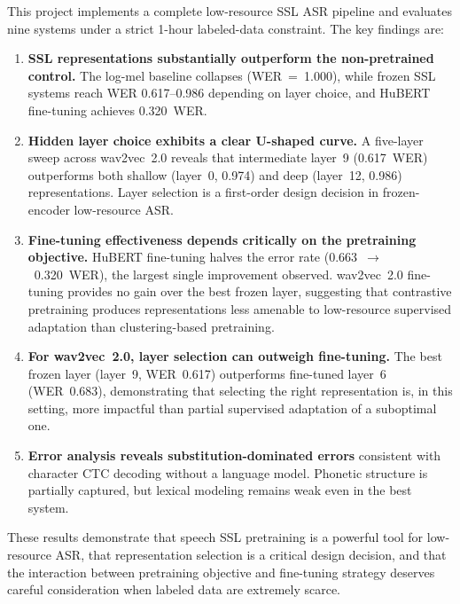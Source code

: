 \documentclass{article}
\begin{document}
This project implements a complete low-resource SSL ASR pipeline and evaluates
nine systems under a strict 1-hour labeled-data constraint. The key findings are:

\begin{enumerate}
\item \textbf{SSL representations substantially outperform the non-pretrained
  control.} The log-mel baseline collapses (WER~=~1.000), while frozen SSL
  systems reach WER 0.617--0.986 depending on layer choice, and HuBERT
  fine-tuning achieves 0.320~WER.
\item \textbf{Hidden layer choice exhibits a clear U-shaped curve.} A five-layer
  sweep across wav2vec~2.0 reveals that intermediate layer~9 (0.617~WER)
  outperforms both shallow (layer~0, 0.974) and deep (layer~12, 0.986)
  representations. Layer selection is a first-order design decision in
  frozen-encoder low-resource ASR.
\item \textbf{Fine-tuning effectiveness depends critically on the pretraining
  objective.} HuBERT fine-tuning halves the error rate (0.663~$\to$~0.320~WER),
  the largest single improvement observed. wav2vec~2.0 fine-tuning provides no
  gain over the best frozen layer, suggesting that contrastive pretraining
  produces representations less amenable to low-resource supervised adaptation
  than clustering-based pretraining.
\item \textbf{For wav2vec~2.0, layer selection can outweigh fine-tuning.} The
  best frozen layer (layer~9, WER~0.617) outperforms fine-tuned layer~6
  (WER~0.683), demonstrating that selecting the right representation is, in
  this setting, more impactful than partial supervised adaptation of a
  suboptimal one.
\item \textbf{Error analysis reveals substitution-dominated errors} consistent
  with character CTC decoding without a language model. Phonetic structure is
  partially captured, but lexical modeling remains weak even in the best system.
\end{enumerate}

These results demonstrate that speech SSL pretraining is a powerful tool for
low-resource ASR, that representation selection is a critical design decision,
and that the interaction between pretraining objective and fine-tuning
strategy deserves careful consideration when labeled data are extremely scarce.



\end{document}

